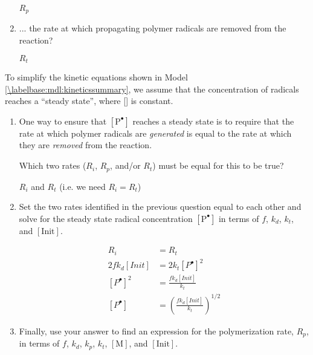 \begin{activity}
\begin{ctqs}
\begin{enumerate}
				\begin{solution}[0.4in]
					$R_p$
				\end{solution}
				
			\item ... the rate at which propagating polymer radicals are removed from the reaction?
			
				\begin{solution}[0.4in]
					$R_t$
				\end{solution}
				
		\end{enumerate}

	\question To simplify the kinetic equations shown in Model \ref{\labelbase:mdl:kineticssummary}, we assume that the concentration of radicals reaches a ``steady state'', where [] is constant.
	
		\begin{enumerate}
			\item One way to ensure that $[\text{P}^{\bullet}]$ reaches a steady state is to require that the rate at which polymer radicals are \emph{generated} is equal to the rate at which they are \emph{removed} from the reaction.
			
				Which two rates ($R_i$, $R_p$, and/or $R_t$) must be equal for this to be true?
				
				\begin{solution}[0.75in]
					$R_i$ and $R_t$ (i.e. we need $R_i=R_t$)
				\end{solution}
				
			\item Set the two rates identified in the previous question equal to each other and solve for the steady state radical concentration $[\text{P}^{\bullet}]$ in terms of $f$, $k_d$, $k_t$, and $[\text{Init}]$.
			
				\begin{solution}[2in]
					\begin{align*}
						R_i &= R_t \\
						2fk_d[Init] &= 2k_t[P^\bullet]^2\\
						[P^\bullet]^2 &= \frac{fk_d[Init]}{k_t}\\
						[P^\bullet] &= \left(\frac{fk_d[Init]}{k_t}\right)^{1/2}
					\end{align*}
				\end{solution}
			
			\item Finally, use your answer to find an expression for the polymerization rate, $R_p$, in terms of $f$, $k_d$, $k_p$, $k_t$, $[\text{M}]$, and $[\text{Init}]$. \label{\labelbase:ctq:Rp}
			

\end{enumerate}
\end{ctqs}
\end{activity}
